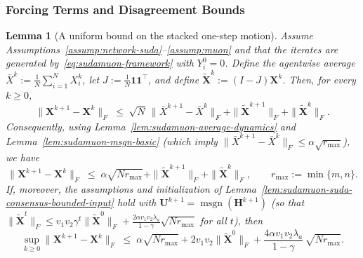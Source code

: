 \documentclass{article}
\newtheorem{lemma}{Lemma}
\begin{document}
\subsubsection*{Forcing Terms and Disagreement Bounds}

\begin{lemma}[A uniform bound on the stacked one-step motion]
\label{lem:sudamuon-stacked-step-bound}
Assume Assumptions~\ref{assump:network-suda}--\ref{assump:muon} and that the iterates are generated by~\eqref{eq:sudamuon-framework} with $Y_i^0=0$.
Define the agentwise average $\bar X^k:=\tfrac{1}{N}\sum_{i=1}^N X_i^k$, let $J:=\tfrac{1}{N}\mathbf{1}\mathbf{1}^\top$, and define $\tilde{\mathbf{X}}^k:=(I-J)\mathbf{X}^k$.
Then, for every $k\ge 0$,
\begin{equation}
\label{eq:stacked-step-decomp}
\|\mathbf{X}^{k+1}-\mathbf{X}^k\|_F
\;\le\;
\sqrt{N}\,\|\bar X^{k+1}-\bar X^k\|_F
+\|\tilde{\mathbf{X}}^{k+1}\|_F+\|\tilde{\mathbf{X}}^{k}\|_F.
\end{equation}
Consequently, using Lemma~\ref{lem:sudamuon-average-dynamics} and Lemma~\ref{lem:sudamuon-msgn-basic} (which imply $\|\bar X^{k+1}-\bar X^k\|_F\le \alpha\sqrt{r_{\max}}$), we have
\begin{equation}
\label{eq:stacked-step-alpha-tilde}
\|\mathbf{X}^{k+1}-\mathbf{X}^k\|_F
\;\le\;
\alpha\sqrt{Nr_{\max}}+\|\tilde{\mathbf{X}}^{k+1}\|_F+\|\tilde{\mathbf{X}}^{k}\|_F,
\qquad r_{\max}:=\min\{m,n\}.
\end{equation}
If, moreover, the assumptions and initialization of Lemma~\ref{lem:sudamuon-suda-consensus-bounded-input} hold with $\mathbf{U}^{k+1}=\operatorname{msgn}(\mathbf{H}^{k+1})$ (so that $\|\tilde{\mathbf{X}}^t\|_F\le v_1v_2\gamma^t\|\tilde{\mathbf{X}}^0\|_F+\tfrac{2\alpha v_1v_2\lambda_a}{1-\gamma}\sqrt{Nr_{\max}}$ for all $t$), then
\begin{equation}
\label{eq:stacked-step-uniform}
\sup_{k\ge 0}\|\mathbf{X}^{k+1}-\mathbf{X}^k\|_F
\;\le\;
\alpha\sqrt{Nr_{\max}}
+2v_1v_2\|\tilde{\mathbf{X}}^0\|_F
+\frac{4\alpha v_1v_2\lambda_a}{1-\gamma}\,\sqrt{Nr_{\max}}.
\end{equation}
\end{lemma}
\end{document}
